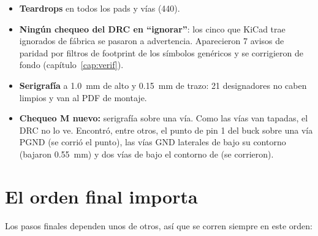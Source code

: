 \begin{itemize}
  \item \textbf{Teardrops} en todos los pads y vías (440).
  \item \textbf{Ningún chequeo del DRC en ``ignorar''}: los cinco que KiCad trae ignorados de fábrica se pasaron a
  advertencia. Aparecieron 7 avisos de paridad por filtros de footprint de los símbolos genéricos y se corrigieron de
  fondo (capítulo~\ref{cap:verif}).
  \item \textbf{Serigrafía} a \SI{1.0}{\milli\meter} de alto y \SI{0.15}{\milli\meter} de trazo: 21 designadores no
  caben limpios y van al PDF de montaje.
  \item \textbf{Chequeo M nuevo:} serigrafía sobre una vía. Como las vías van tapadas, el DRC no lo ve. Encontró, entre
  otros, el punto de pin 1 del buck sobre una vía PGND (se corrió el punto), las vías GND laterales de  bajo
  su contorno (bajaron \SI{0.55}{\milli\meter}) y dos vías de  bajo el contorno de  (se corrieron).
\end{itemize}

\section{El orden final importa}\label{sec:c09-orden}

Los pasos finales dependen unos de otros, así que se corren siempre en este orden:

\begin{center}
\end{center}

